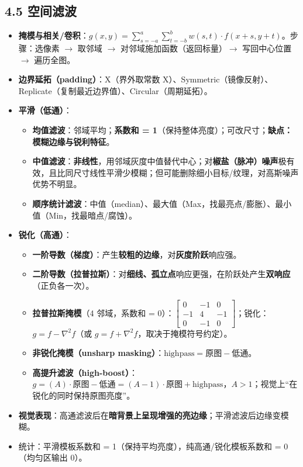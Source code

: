 \subsection*{4.5 空间滤波}
\begin{itemize}
\item \textbf{掩模与相关/卷积}：$g(x,y)=\sum_{s=-a}^{a}\sum_{t=-b}^{b}w(s,t)\cdot f(x+s,y+t)$。步骤：选像素 $\to$ 取邻域 $\to$ 对邻域施加函数（返回标量）$\to$ 写回中心位置 $\to$ 遍历全图。
\item \textbf{边界延拓（padding）}：X（界外取常数 X）、Symmetric（镜像反射）、Replicate（复制最近边界值）、Circular（周期延拓）。
\item \textbf{平滑（低通）}：
\begin{itemize}
\item \textbf{均值滤波}：邻域平均；\textbf{系数和 = 1}（保持整体亮度）；可改尺寸；\textbf{缺点：模糊边缘与锐利特征}。
\item \textbf{中值滤波}：\textbf{非线性}，用邻域灰度中值替代中心；对\textbf{椒盐（脉冲）噪声}极有效，且比同尺寸线性平滑少模糊；但可能删除细小目标/纹理，对高斯噪声优势不明显。
\item \textbf{顺序统计滤波}：中值（median）、最大值（Max，找最亮点/膨胀）、最小值（Min，找最暗点/腐蚀）。
\end{itemize}
\item \textbf{锐化（高通）}：
\begin{itemize}
\item \textbf{一阶导数（梯度）}：产生\textbf{较粗的边缘}，对\textbf{灰度阶跃}响应强。
\item \textbf{二阶导数（拉普拉斯）}：对\textbf{细线、孤立点}响应更强，在阶跃处产生\textbf{双响应}（正负各一次）。
\item \textbf{拉普拉斯掩模}（4 邻域，系数和 = 0）：$\begin{bmatrix}0&-1&0\\-1&4&-1\\0&-1&0\end{bmatrix}$；锐化：$g=f-\nabla^2f$（或 $g=f+\nabla^2f$，取决于掩模符号约定）。
\item \textbf{非锐化掩模（unsharp masking）}：$\mathrm{highpass}=\text{原图}-\text{低通}$。
\item \textbf{高提升滤波（high-boost）}：$g=(A)\cdot\text{原图}-\text{低通}=(A-1)\cdot\text{原图}+\mathrm{highpass}$，$A>1$；视觉上“在锐化的同时保持原图亮度”。
\end{itemize}
\item \textbf{视觉表现}：高通滤波后在\textbf{暗背景上呈现增强的亮边缘}；平滑滤波后边缘变模糊。
\item 统计：平滑模板系数和 = 1（保持平均亮度），纯高通/锐化模板系数和 = 0（均匀区输出 0）。
\end{itemize}
